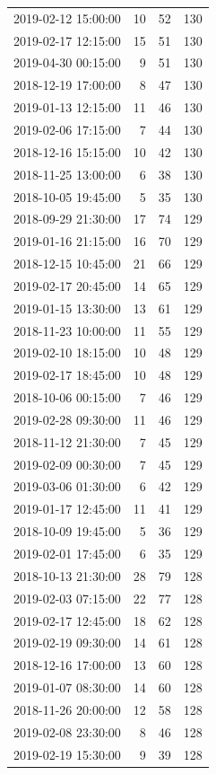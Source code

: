 \begin{tabular}{lrrr}
2019-02-12 15:00:00 & 10 & 52 & 130 \\
2019-02-17 12:15:00 & 15 & 51 & 130 \\
2019-04-30 00:15:00 & 9 & 51 & 130 \\
2018-12-19 17:00:00 & 8 & 47 & 130 \\
2019-01-13 12:15:00 & 11 & 46 & 130 \\
2019-02-06 17:15:00 & 7 & 44 & 130 \\
2018-12-16 15:15:00 & 10 & 42 & 130 \\
2018-11-25 13:00:00 & 6 & 38 & 130 \\
2018-10-05 19:45:00 & 5 & 35 & 130 \\
2018-09-29 21:30:00 & 17 & 74 & 129 \\
2019-01-16 21:15:00 & 16 & 70 & 129 \\
2018-12-15 10:45:00 & 21 & 66 & 129 \\
2019-02-17 20:45:00 & 14 & 65 & 129 \\
2019-01-15 13:30:00 & 13 & 61 & 129 \\
2018-11-23 10:00:00 & 11 & 55 & 129 \\
2019-02-10 18:15:00 & 10 & 48 & 129 \\
2019-02-17 18:45:00 & 10 & 48 & 129 \\
2018-10-06 00:15:00 & 7 & 46 & 129 \\
2019-02-28 09:30:00 & 11 & 46 & 129 \\
2018-11-12 21:30:00 & 7 & 45 & 129 \\
2019-02-09 00:30:00 & 7 & 45 & 129 \\
2019-03-06 01:30:00 & 6 & 42 & 129 \\
2019-01-17 12:45:00 & 11 & 41 & 129 \\
2018-10-09 19:45:00 & 5 & 36 & 129 \\
2019-02-01 17:45:00 & 6 & 35 & 129 \\
2018-10-13 21:30:00 & 28 & 79 & 128 \\
2019-02-03 07:15:00 & 22 & 77 & 128 \\
2019-02-17 12:45:00 & 18 & 62 & 128 \\
2019-02-19 09:30:00 & 14 & 61 & 128 \\
2018-12-16 17:00:00 & 13 & 60 & 128 \\
2019-01-07 08:30:00 & 14 & 60 & 128 \\
2018-11-26 20:00:00 & 12 & 58 & 128 \\
2019-02-08 23:30:00 & 8 & 46 & 128 \\
2019-02-19 15:30:00 & 9 & 39 & 128 \\

\end{tabular}
